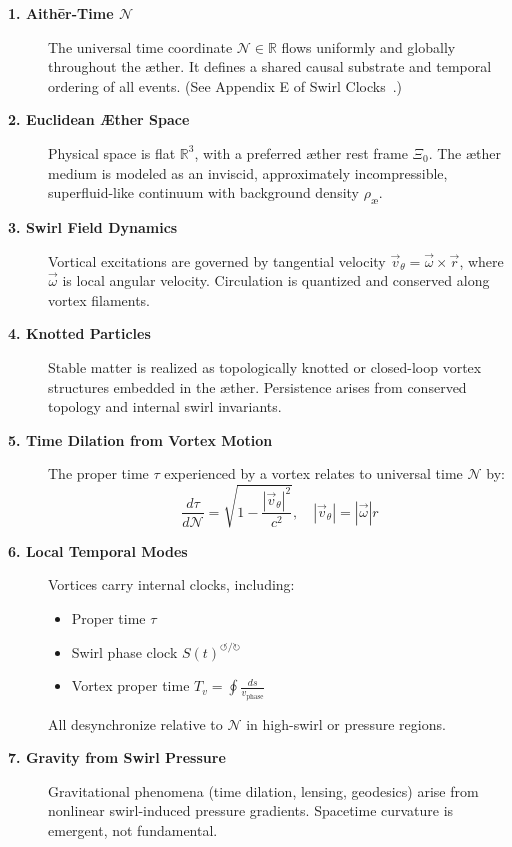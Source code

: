 \documentclass[11pt]{article}
\begin{document}
    \begin{description}
        \item[\textbf{1. Aithēr-Time \(\mathcal{N}\)}]%
        The universal time coordinate \( \mathcal{N} \in \mathbb{R} \) flows uniformly and globally throughout the æther. It defines a shared
        causal substrate and temporal ordering of all events. (See Appendix E of Swirl Clocks~\cite{iskandarani2025vam2}.)

        \item[\textbf{2. Euclidean Æther Space}]%
        Physical space is flat \( \mathbb{R}^3 \), with a preferred æther rest frame \( \Xi_0 \). The æther medium is modeled as an inviscid, approximately incompressible, superfluid-like continuum with background density \( \rho_{\text{\ae}} \).

        \item[\textbf{3. Swirl Field Dynamics}]%
        Vortical excitations are governed by tangential velocity \( \vec{v}_\theta = \vec{\omega} \times \vec{r} \), where \( \vec{\omega} \) is local angular velocity. Circulation is quantized and conserved along vortex filaments.

        \item[\textbf{4. Knotted Particles}]%
        Stable matter is realized as topologically knotted or closed-loop vortex structures embedded in the æther. Persistence arises from conserved topology and internal swirl invariants.

        \item[\textbf{5. Time Dilation from Vortex Motion}]%
        The proper time \( \tau \) experienced by a vortex relates to universal time \( \mathcal{N} \) by:
        \begin{equation}
            \boxed{
                \frac{d\tau}{d\mathcal{N}} = \sqrt{1 - \frac{|\vec{v}_\theta|^2}{c^2}}, \quad |\vec{v}_\theta| = |\vec{\omega}| r
            }
            \label{eq:tau-dilation}
        \end{equation}


        \item[\textbf{6. Local Temporal Modes}]%
        Vortices carry internal clocks, including:
        \begin{itemize}
            \item Proper time \( \tau \)
            \item Swirl phase clock \( S(t)^{\circlearrowleft\!/\!\circlearrowright} \)
            \item Vortex proper time \( T_v = \oint \frac{ds}{v_\text{phase}} \)
        \end{itemize}
        All desynchronize relative to \( \mathcal{N} \) in high-swirl or pressure regions.

        \item[\textbf{7. Gravity from Swirl Pressure}]%
        Gravitational phenomena (time dilation, lensing, geodesics) arise from nonlinear swirl-induced pressure gradients. Spacetime curvature is emergent, not fundamental.
    \end{description}
\end{document}
